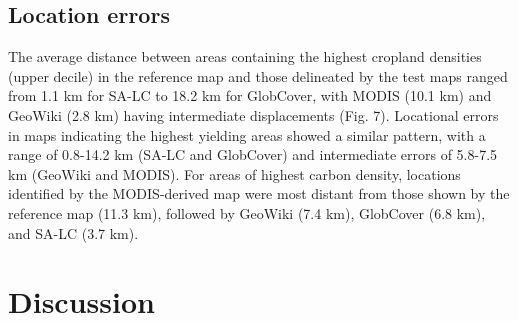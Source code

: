 \documentclass[a4paper]{article}
\begin{document}
\vspace{-0.3 cm}
\subsection*{Location errors}
\vspace{-0.2 cm}
The average distance between areas containing the highest cropland densities (upper decile) in the reference map and those delineated by the test maps ranged from 1.1 km for SA-LC to 18.2 km for GlobCover, with MODIS (10.1 km) and GeoWiki (2.8 km) having intermediate displacements (Fig. 7). Locational errors in maps indicating the highest yielding areas showed a similar pattern, with a range of 0.8-14.2 km (SA-LC and GlobCover) and intermediate errors of 5.8-7.5 km (GeoWiki and MODIS). For areas of highest carbon density, locations identified by the MODIS-derived map were most distant from those shown by the reference map (11.3 km), followed by GeoWiki (7.4 km), GlobCover (6.8 km), and SA-LC (3.7 km).   




\vspace{-0.5 cm}
\section*{Discussion}
\vspace{-0.2 cm}
\end{document}
